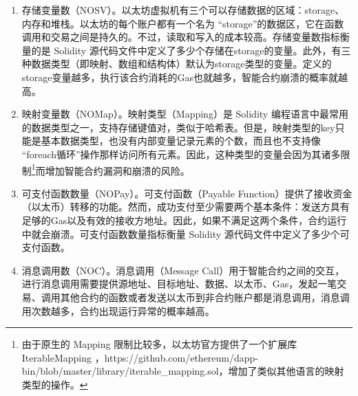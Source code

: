 \begin{enumerate}[label=(\arabic*)]
    \item 存储变量数（NOSV）。以太坊虚拟机有三个可以存储数据的区域：storage、内存和堆栈。以太坊的每个账户都有一个名为 “storage”的数据区，它在函数调用和交易之间是持久的。不过，读取和写入的成本较高。存储变量数指标衡量的是 Solidity 源代码文件中定义了多少个存储在storage的变量。此外，有三种数据类型（即映射、数组和结构体）默认为storage类型的变量。定义的storage变量越多，执行该合约消耗的Gas也就越多，智能合约崩溃的概率就越高。
    \item 映射变量数（NOMap）。映射类型（Mapping）是 Solidity 编程语言中最常用的数据类型之一，支持存储键值对，类似于哈希表。但是，映射类型的key只能是基本数据类型，也没有内部变量记录元素的个数，而且也不支持像 “foreach循环”操作那样访问所有元素。因此，这种类型的变量会因为其诸多限制\footnote{由于原生的 Mapping 限制比较多，以太坊官方提供了一个扩展库 IterableMapping ，https://github.com/ethereum/dapp-bin/blob/master/library/iterable\_mapping.sol，增加了类似其他语言的映射类型的操作。}而增加智能合约漏洞和崩溃的风险。
    \item 可支付函数数量（NOPay）。可支付函数（Payable Function）提供了接收资金（以太币）转移的功能。然而，成功支付至少需要两个基本条件：发送方具有足够的Gas以及有效的接收方地址。因此，如果不满足这两个条件，合约运行中就会崩溃。可支付函数数量指标衡量 Solidity 源代码文件中定义了多少个可支付函数。
    \item 消息调用数（NOC）。消息调用（Message Call）用于智能合约之间的交互，进行消息调用需要提供源地址、目标地址、数据、以太币、Gas，发起一笔交易、调用其他合约的函数或者发送以太币到非合约账户都是消息调用，消息调用次数越多，合约出现运行异常的概率越高。

\end{enumerate}
